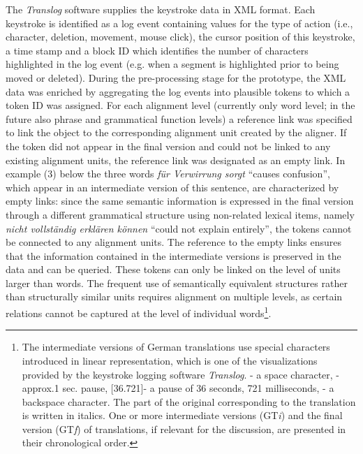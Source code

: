 \documentclass[output=paper]{LSP/langsci}
\begin{document}
The \textit{Translog} software supplies the keystroke data in XML format. Each keystroke is identified as a log event containing values for the type of action (i.e., character, deletion, movement, mouse click), the cursor position of this keystroke, a time stamp and a block ID which identifies the number of characters highlighted in the log event (e.g. when a segment is highlighted prior to being moved or deleted). During the pre-processing stage for the prototype, the XML data was enriched by aggregating the log events into plausible tokens to which a token ID was assigned. For each alignment level (currently only word level; in the future also phrase and grammatical function levels) a reference link was specified to link the object to the corresponding alignment unit created by the aligner. If the token did not appear in the final version and could not be linked to any existing alignment units, the reference link was designated as an empty link. In example (3) below the three words \textit{für Verwirrung sorgt} “causes confusion”, which appear in an intermediate version of this sentence, are characterized by empty links: since the same semantic information is expressed in the final version through a different grammatical structure using non-related lexical items, namely \textit{nicht vollständig erklären können} “could not explain entirely”, the tokens cannot be connected to any alignment units. The reference to the empty links ensures that the information contained in the intermediate versions is preserved in the data and can be queried. These tokens can only be linked on the level of units larger than words. The frequent use of semantically equivalent structures rather than structurally similar units requires alignment on multiple levels, as certain relations cannot be captured at the level of individual words\footnote{The intermediate versions of German translations use special characters introduced in linear representation, which is one of the visualizations provided by the keystroke logging software \textit{Translog}.  {\raute} - a space character, {\stern} -  approx.1 sec. pause, [{\stern}36.721]- a pause of 36 seconds, 721 milliseconds,{\pfeil} - a backspace character. The part of the original corresponding to the translation is written in italics. One or more intermediate versions (GT\textit{i}) and the final version (GT\textit{f}) of translations, if relevant for the discussion, are presented in their chronological order.}.
\end{document}
